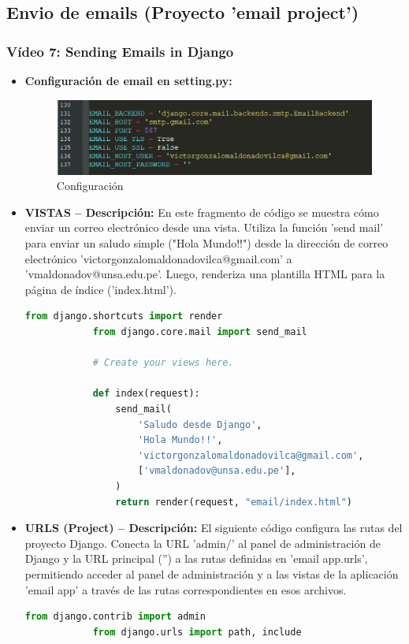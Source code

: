 \documentclass{article}
\begin{document}

  \subsection{Envio de emails (Proyecto 'email project')}
  

  \subsubsection{Vídeo 7: Sending Emails in Django}
    \begin{itemize}
        \item \textbf{Configuración de email en setting.py: } 
          \begin{figure}[H]
            \centering
            \includegraphics[width=1\textwidth, keepaspectratio]{img/emailconf.png}
            \caption{Configuración}
          \end{figure}
        \item \textbf{VISTAS -- Descripción: }En este fragmento de código se muestra cómo enviar un correo electrónico desde una vista. 
          Utiliza la función 'send mail' para enviar un saludo simple ("Hola Mundo!!") desde la dirección de correo electrónico 
          'victorgonzalomaldonadovilca@gmail.com' a 'vmaldonadov@unsa.edu.pe'. Luego, renderiza una plantilla HTML para la página de 
          índice ('index.html').
          \begin{lstlisting}[language=Python]
            from django.shortcuts import render
            from django.core.mail import send_mail

            # Create your views here.

            def index(request):
                send_mail(
                    'Saludo desde Django',
                    'Hola Mundo!!',
                    'victorgonzalomaldonadovilca@gmail.com',
                    ['vmaldonadov@unsa.edu.pe'],
                )
                return render(request, "email/index.html")
          \end{lstlisting}
        \item \textbf{URLS (Project) -- Descripción: }El siguiente código configura las rutas del proyecto Django. Conecta la URL 'admin/' 
          al panel de administración de Django y la URL principal ('') a las rutas definidas en 'email app.urls', permitiendo acceder al panel 
          de administración y a las vistas de la aplicación 'email app' a través de las rutas correspondientes en esos archivos.
          \begin{lstlisting}[language=Python]
            from django.contrib import admin
            from django.urls import path, include


\end{lstlisting}
\end{itemize}
\end{document}
